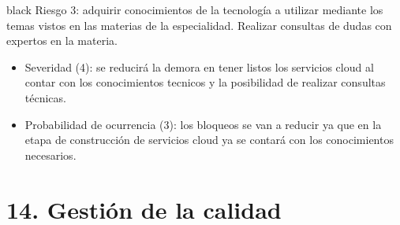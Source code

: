 \documentclass[
11pt, %
codirector, %
]{charter}
\begin{document}
\begin{consigna}{black}
Riesgo 3: adquirir conocimientos de la tecnología a utilizar mediante los temas vistos en las materias de la especialidad. Realizar consultas de dudas con expertos en la materia.
	\begin{itemize}
	\item Severidad (4): se reducirá la demora en tener listos los servicios cloud al contar con los conocimientos tecnicos y la posibilidad de realizar consultas técnicas.
	\item Probabilidad de ocurrencia (3): los bloqueos se van a reducir ya que en la etapa de construcción de servicios cloud ya se contará con los conocimientos necesarios.
	\end{itemize} 


\end{consigna}

\pagebreak
\section{14. Gestión de la calidad}
\label{sec:calidad}
\end{document}
